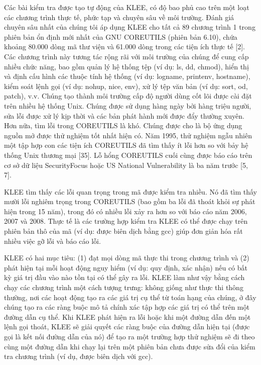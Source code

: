 \documentclass[12pt,a4paper]{article}
\begin{document}
\indent Các bài kiểm tra được tạo tự động của KLEE, có độ bao phủ cao trên một loạt các chương trình thực tế, phức tạp và chuyên sâu về môi trường. Đánh giá chuyên sâu nhất của chúng tôi áp dụng KLEE cho tất cả 89 chương trình 1 trong phiên bản ổn định mới nhất của GNU COREUTILS (phiên bản 6.10), chứa khoảng 80.000 dòng mã thư viện và 61.000 dòng trong các tiện ích thực tế [2]. Các chương trình này tương tác rộng rãi với môi trường của chúng để cung cấp nhiều chức năng, bao gồm quản lý hệ thống tệp (ví dụ: ls, dd, chmod), hiển thị và định cấu hình các thuộc tính hệ thống (ví dụ: logname, printenv, hostname), kiểm soát lệnh gọi (ví dụ: nohup, nice, env), xử lý tệp văn bản (ví dụ: sort, od, patch), v.v. Chúng tạo thành môi trường cấp độ người dùng cốt lõi được cài đặt trên nhiều hệ thống Unix. Chúng được sử dụng hàng ngày bởi hàng triệu người, sửa lỗi được xử lý kịp thời và các bản phát hành mới được đẩy thường xuyên. Hơn nữa, tìm lỗi trong COREUTILS là khó. Chúng được cho là bộ ứng dụng nguồn mở được thử nghiệm tốt nhất hiện có. Năm 1995, thử nghiệm ngẫu nhiên một tập hợp con các tiện ích COREUTILS đã tìm thấy ít lỗi hơn so với bảy hệ thống Unix thương mại [35]. Lỗ hổng COREUTILS cuối cùng được báo cáo trên cơ sở dữ liệu SecurityFocus hoặc US National Vulnerability là ba năm trước [5, 7].

\indent KLEE tìm thấy các lỗi quan trọng trong mã được kiểm tra nhiều. Nó đã tìm thấy mười lỗi nghiêm trọng trong COREUTILS (bao gồm ba lỗi đã thoát khỏi sự phát hiện trong 15 năm), trong đó có nhiều lỗi xảy ra hơn so với báo cáo năm 2006, 2007 và 2008. Thực tế là các trường hợp kiểm tra KLEE có thể được chạy trên phiên bản thô của mã (ví dụ: được biên dịch bằng gcc) giúp đơn giản hóa rất nhiều việc gỡ lỗi và báo cáo lỗi.

\indent KLEE có hai mục tiêu: (1) đạt mọi dòng mã thực thi trong chương trình và (2) phát hiện tại mỗi hoạt động nguy hiểm (ví dụ: quy định, xác nhận) nếu có bất kỳ giá trị đầu vào nào tồn tại có thể gây ra lỗi. KLEE làm như vậy bằng cách chạy các chương trình một cách tượng trưng: không giống như thực thi thông thường, nơi các hoạt động tạo ra các giá trị cụ thể từ toán hạng của chúng, ở đây chúng tạo ra các ràng buộc mô tả chính xác tập hợp các giá trị có thể trên một đường dẫn cụ thể. Khi KLEE phát hiện ra lỗi hoặc khi một đường dẫn đến một lệnh gọi thoát, KLEE sẽ giải quyết các ràng buộc của đường dẫn hiện tại (được gọi là kết nối đường dẫn của nó) để tạo ra một trường hợp thử nghiệm sẽ đi theo cùng một đường dẫn khi chạy lại trên một phiên bản chưa được sửa đổi của kiểm tra chương trình (ví dụ, được biên dịch với gcc).
\end{document}
